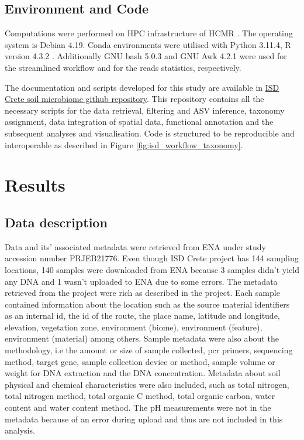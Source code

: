 \subsection{Environment and Code}

Computations were performed on HPC infrastructure of HCMR \parencite{zafeiropoulos_0s_2021}.
The operating system is Debian 4.19. Conda environments were utilised
with Python 3.11.4, R version 4.3.2 \parencite{rcoreteam}.
Additionally GNU bash 5.0.3 and GNU Awk 4.2.1 were used for the streamlined workflow 
and for the reads statistics, respectively.

The documentation and scripts developed for this study are available in
\href{https://github.com/GenomicsStandardsConsortium/ISD}{ISD Crete soil microbiome github repository}.
This repository contains all the necessary scripts for the data retrieval,
filtering and ASV inference, taxonomy assignment, data integration of spatial data, 
functional annotation and the subsequent analyses and visualisation.
Code is structured to be reproducible and interoperable as described in Figure \ref{fig:isd_workflow_taxonomy}.

\section{Results}\label{isd_results}

\subsection{Data description}
Data and its' associated metadata were retrieved from ENA under study
accession number PRJEB21776.
Even though ISD Crete project has 144 sampling locations, 140 samples were
downloaded from ENA because 3 samples didn't yield any DNA and 1 wasn't uploaded to ENA due 
to some errors.
The metadata retrieved from the project were rich as described in the project. 
Each sample contained information about the location such as the source material identifiers as an internal
id, the id of the route, the place name, latitude and longitude, elevation, vegetation zone,
environment (biome), environment (feature), environment (material) among others.
Sample metadata were also about the methodology, i.e the amount or size of sample collected,
pcr primers, sequencing method, target gene, sample collection device or method,
sample volume or weight for DNA extraction and the DNA concentration.
Metadata about soil physical and chemical characteristics were also included, 
such as total nitrogen, total nitrogen method, total organic C method,
total organic carbon, water content and water content method. The pH measurements
were not in the metadata because of an error during upload and thus are not 
included in this analysis.

